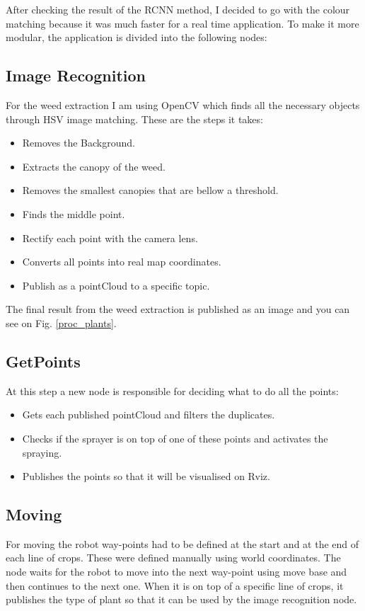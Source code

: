 \documentclass[journal]{IEEEtran}
\begin{document}
After checking the result of the RCNN method, I decided to go with the colour matching because it was much faster for a real time application. To make it more modular, the application is divided into the following nodes:

\subsection{Image Recognition}
For the weed extraction I am using OpenCV which finds all the necessary objects through HSV image matching. These are the steps it takes:
\begin{itemize}
  \item Removes the Background.
  \item Extracts the canopy of the weed.
  \item Removes the smallest canopies that are bellow a threshold.
  \item Finds the middle point.
  \item Rectify each point with the camera lens.
  \item Converts all points into real map coordinates.
  \item Publish as a pointCloud to a specific topic.
\end{itemize}
The final result from the weed extraction is published as an image and you can see on Fig. \ref{proc_plants}.

\subsection{GetPoints}
At this step a new node is responsible for deciding what to do all the points:
\begin{itemize}
  \item Gets each published pointCloud and filters the duplicates.
  \item Checks if the sprayer is on top of one of these points and activates the spraying.
  \item Publishes the points so that it will be visualised on Rviz.
\end{itemize}

\subsection{Moving}
For moving the robot way-points had to be defined at the start and at the end of each line of crops. These were defined manually using world coordinates. The node waits for the robot to move into the next way-point using move base and then continues to the next one. When it is on top of a specific line of crops, it publishes the type of plant so that it can be used by the image recognition node.
\end{document}
